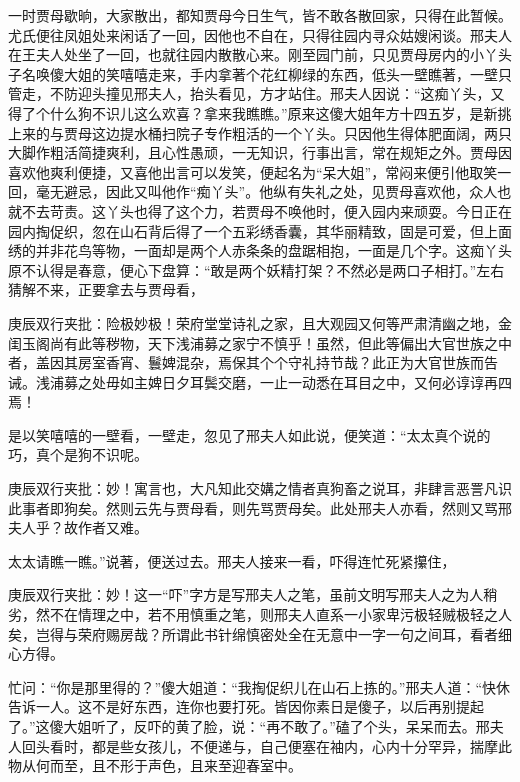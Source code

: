 \begin{parag}


    一时贾母歇晌，大家散出，都知贾母今日生气，皆不敢各散回家，只得在此暂候。尤氏便往凤姐处来闲话了一回，因他也不自在，只得往园内寻众姑嫂闲谈。邢夫人在王夫人处坐了一回，也就往园内散散心来。刚至园门前，只见贾母房内的小丫头子名唤傻大姐的笑嘻嘻走来，手内拿著个花红柳绿的东西，低头一壁瞧著，一壁只管走，不防迎头撞见邢夫人，抬头看见，方才站住。邢夫人因说：“这痴丫头，又得了个什么狗不识儿这么欢喜？拿来我瞧瞧。”原来这傻大姐年方十四五岁，是新挑上来的与贾母这边提水桶扫院子专作粗活的一个丫头。只因他生得体肥面阔，两只大脚作粗活简捷爽利，且心性愚顽，一无知识，行事出言，常在规矩之外。贾母因喜欢他爽利便捷，又喜他出言可以发笑，便起名为“呆大姐”，常闷来便引他取笑一回，毫无避忌，因此又叫他作“痴丫头”。他纵有失礼之处，见贾母喜欢他，众人也就不去苛责。这丫头也得了这个力，若贾母不唤他时，便入园内来顽耍。今日正在园内掏促织，忽在山石背后得了一个五彩绣香囊，其华丽精致，固是可爱，但上面绣的并非花鸟等物，一面却是两个人赤条条的盘踞相抱，一面是几个字。这痴丫头原不认得是春意，便心下盘算：“敢是两个妖精打架？不然必是两口子相打。”左右猜解不来，正要拿去与贾母看，\begin{note}庚辰双行夹批：险极妙极！荣府堂堂诗礼之家，且大观园又何等严肃清幽之地，金闺玉阁尚有此等秽物，天下浅浦募之家宁不慎乎！虽然，但此等偏出大官世族之中者，盖因其房室香宵、鬟婢混杂，焉保其个个守礼持节哉？此正为大官世族而告诫。浅浦募之处毋如主婢日夕耳鬓交磨，一止一动悉在耳目之中，又何必谆谆再四焉！\end{note}是以笑嘻嘻的一壁看，一壁走，忽见了邢夫人如此说，便笑道：“太太真个说的巧，真个是狗不识呢。\begin{note}庚辰双行夹批：妙！寓言也，大凡知此交媾之情者真狗畜之说耳，非肆言恶詈凡识此事者即狗矣。然则云先与贾母看，则先骂贾母矣。此处邢夫人亦看，然则又骂邢夫人乎？故作者又难。\end{note}太太请瞧一瞧。”说著，便送过去。邢夫人接来一看，吓得连忙死紧攥住，\begin{note}庚辰双行夹批：妙！这一“吓”字方是写邢夫人之笔，虽前文明写邢夫人之为人稍劣，然不在情理之中，若不用慎重之笔，则邢夫人直系一小家卑污极轻贼极轻之人矣，岂得与荣府赐房哉？所谓此书针绵慎密处全在无意中一字一句之间耳，看者细心方得。\end{note}忙问：“你是那里得的？”傻大姐道：“我掏促织儿在山石上拣的。”邢夫人道：“快休告诉一人。这不是好东西，连你也要打死。皆因你素日是傻子，以后再别提起了。”这傻大姐听了，反吓的黄了脸，说：“再不敢了。”磕了个头，呆呆而去。邢夫人回头看时，都是些女孩儿，不便递与，自己便塞在袖内，心内十分罕异，揣摩此物从何而至，且不形于声色，且来至迎春室中。
\end{parag}


